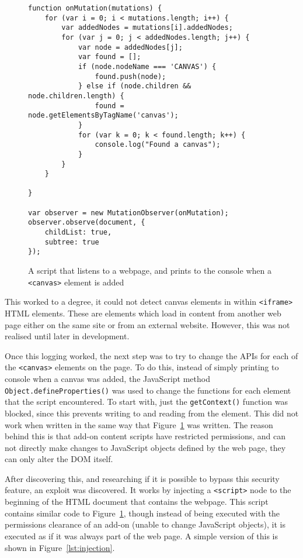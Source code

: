 \begin{figure}[h!]
\begin{lstlisting}
function onMutation(mutations) {
    for (var i = 0; i < mutations.length; i++) {
        var addedNodes = mutations[i].addedNodes;
        for (var j = 0; j < addedNodes.length; j++) {
            var node = addedNodes[j];
            var found = [];
            if (node.nodeName === 'CANVAS') {
                found.push(node);
            } else if (node.children && node.children.length) {
                found = node.getElementsByTagName('canvas');
            }
            for (var k = 0; k < found.length; k++) {
                console.log("Found a canvas");
            }
        }
    }

}

var observer = new MutationObserver(onMutation);
observer.observe(document, {
    childList: true,
    subtree: true
});
\end{lstlisting}
\caption{A script that listens to a webpage, and prints to the console when a \texttt{<canvas>} element is added}
\label{lst:canvas-logger}
\end{figure}

This worked to a degree, it could not detect canvas elements in within \texttt{<iframe>} HTML elements.
These are elements which load in content from another web page either on the same site or from an external website.
However, this was not realised until later in development.

Once this logging worked, the next step was to try to change the APIs for each of the \texttt{<canvas>} elements on the page.
To do this, instead of simply printing to console when a canvas was added, the JavaScript method \texttt{Object.defineProperties()} was used to change the functions for each element that the script encountered.
To start with, just the \texttt{getContext()} function was blocked, since this prevents writing to and reading from the element.
This did not work when written in the same way that Figure~\ref{lst:canvas-logger} was written.
The reason behind this is that add-on content scripts have restricted permissions, and can not directly make changes to JavaScript objects defined by the web page, they can only alter the DOM itself.

After discovering this, and researching if it is possible to bypass this security feature, an exploit was discovered.
It works by injecting a \texttt{<script>} node to the beginning of the HTML document that contains the webpage.
This script contains similar code to Figure~\ref{lst:canvas-logger}, though instead of being executed with the permissions clearance of an add-on (unable to change JavaScript objects), it is executed as if it was always part of the web page.
A simple version of this is shown in Figure~\ref{lst:injection}.

